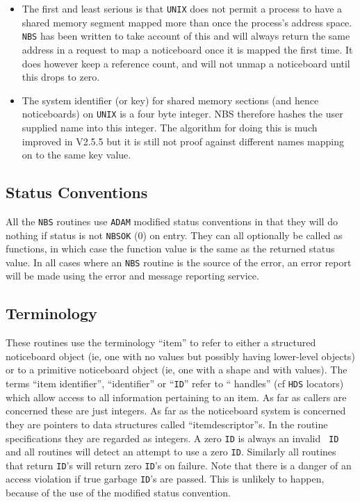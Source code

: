 \documentclass[twoside,11pt]{article}
\renewcommand{\_}{\texttt{\symbol{95}}}
\newcommand{\mantt}{\tt}
\begin{document}
\begin{itemize}
\item The first and least serious is that {\tt UNIX} does not permit
a process to have a shared memory segment mapped more than once 
the process's address space. {\tt NBS} has been written to take
account of this and will always return the same address in a request
to map a noticeboard once it is mapped the first time. It does however
keep a reference count, and will not unmap a noticeboard until this
drops to zero.
\item The system identifier (or key) for shared memory sections (and hence
noticeboards) on {\tt UNIX} is a four byte integer. NBS therefore hashes
the user supplied name into this integer. The algorithm for doing this
is much improved in V2.5.5 but it is still not proof against different
names mapping on to the same key value.
\end{itemize}
       
      \subsection {Status Conventions} All the {\tt NBS} routines use {%
\tt ADAM} modified
      status conventions in that they will do nothing if status is not {%
\tt NBS\_\_OK}
      (0) on entry. They can all optionally be called as functions, in which
      case the function value is the same as the returned status value. In
      all cases where an {\tt NBS} routine is the source of the error, an 
      error report will be made using the error and message reporting service.

      \subsection {Terminology} These routines use the terminology ``item'' to
      refer to either a structured noticeboard object (ie, one with no values
      but possibly having lower-level objects) or to a primitive noticeboard
      object (ie, one with a shape and with values). The terms
      ``item identifier'', ``identifier'' or ``{\tt ID}'' refer to ``%
handles'' (cf {\tt HDS}
      locators) which allow access to all information pertaining to an item. As
      far as callers are concerned these are just integers. As far as the
      noticeboard system is concerned they are pointers to data structures
      called ``item\_descriptor''s. In the routine specifications they are
      regarded as integers. A zero {\mantt{ID}} is always an invalid {\mantt{%
ID}} and all routines
      will detect an attempt to use a zero {\mantt{ID}}. Similarly all %
routines that
      return {\mantt{ID}}'s will return zero {\mantt{ID}}'s on failure. Note %
that there is a danger
      of an access violation if true garbage {\mantt{ID}}'s are passed. This %
is unlikely
      to happen, because of the use of the modified status convention.
\end{document}
